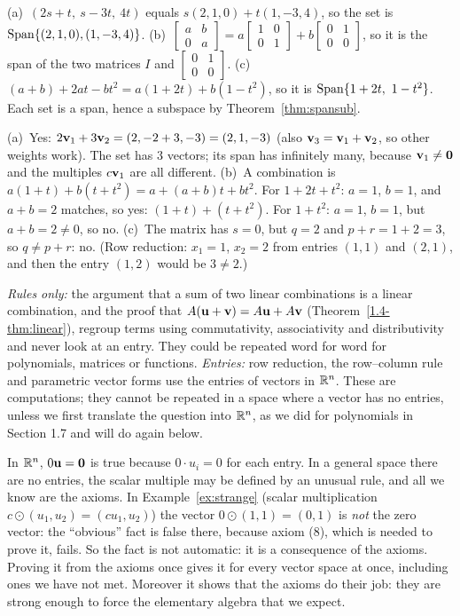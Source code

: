 \documentclass[11pt]{article}
\begin{document}
\begin{description}[leftmargin=0pt,itemsep=5pt]
  \item[Knowledge Check \ref{kc:aspan}.] (a)~$(2s+t,\ s-3t,\ 4t)$ equals $s(2,1,0)+t(1,-3,4)$, so the set is $\operatorname{Span}\{(2,1,0),(1,-3,4)\}$. (b)~$\begin{bmatrix}a&b\\0&a\end{bmatrix}=a\begin{bmatrix}1&0\\0&1\end{bmatrix}+b\begin{bmatrix}0&1\\0&0\end{bmatrix}$, so it is the span of the two matrices $I$ and $\begin{bmatrix}0&1\\0&0\end{bmatrix}$. (c)~$(a+b)+2at-bt^2=a(1+2t)+b(1-t^2)$, so it is $\operatorname{Span}\{1+2t,\ 1-t^2\}$. Each set is a span, hence a subspace by Theorem~\ref{thm:spansub}.
  \item[Knowledge Check \ref{kc:member}.] (a)~Yes: $2\mathbf{v}_1+3\mathbf{v}_2=(2,-2+3,-3)=(2,1,-3)$ (also $\mathbf{v}_3=\mathbf{v}_1+\mathbf{v}_2$, so other weights work). The set has $3$ vectors; its span has infinitely many, because $\mathbf{v}_1\neq\mathbf{0}$ and the multiples $c\mathbf{v}_1$ are all different. (b)~A combination is $a(1+t)+b(t+t^2)=a+(a+b)t+bt^2$. For $1+2t+t^2$: $a=1$, $b=1$, and $a+b=2$ matches, so yes: $(1+t)+(t+t^2)$. For $1+t^2$: $a=1$, $b=1$, but $a+b=2\neq0$, so no. (c)~The matrix has $s=0$, but $q=2$ and $p+r=1+2=3$, so $q\neq p+r$: no. (Row reduction: $x_1=1$, $x_2=2$ from entries $(1,1)$ and $(2,1)$, and then the entry $(1,2)$ would be $3\neq2$.)
  \item[Pause and think \ref{think:used}.] \emph{Rules only:} the argument that a sum of two linear combinations is a linear combination, and the proof that $A(\mathbf{u}+\mathbf{v})=A\mathbf{u}+A\mathbf{v}$ (Theorem~\ref{1.4-thm:linear}), regroup terms using commutativity, associativity and distributivity and never look at an entry. They could be repeated word for word for polynomials, matrices or functions. \emph{Entries:} row reduction, the row--column rule and parametric vector forms use the entries of vectors in $\mathbb{R}^n$. These are computations; they cannot be repeated in a space where a vector has no entries, unless we first translate the question into $\mathbb{R}^n$, as we did for polynomials in Section 1.7 and will do again below.
  \item[Pause and think \ref{think:prove}.] In $\mathbb{R}^n$, $0\mathbf{u}=\mathbf{0}$ is true because $0\cdot u_i=0$ for each entry. In a general space there are no entries, the scalar multiple may be defined by an unusual rule, and all we know are the axioms. In Example~\ref{ex:strange} (scalar multiplication $c\odot(u_1,u_2)=(cu_1,u_2)$) the vector $0\odot(1,1)=(0,1)$ is \emph{not} the zero vector: the ``obvious'' fact is false there, because axiom (8), which is needed to prove it, fails. So the fact is not automatic: it is a consequence of the axioms. Proving it from the axioms once gives it for every vector space at once, including ones we have not met. Moreover it shows that the axioms do their job: they are strong enough to force the elementary algebra that we expect.

\end{description}
\end{document}
